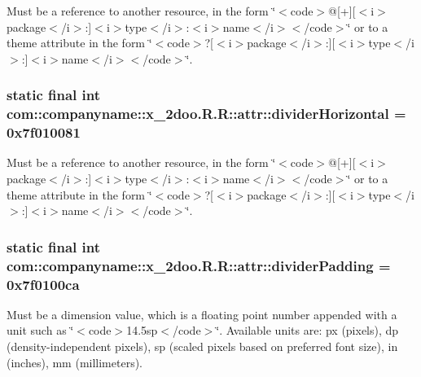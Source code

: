 Must be a reference to another resource, in the form \char`\"{}$<$code$>$@\mbox{[}+\mbox{]}\mbox{[}$<$i$>$package$<$/i$>$:\mbox{]}$<$i$>$type$<$/i$>$:$<$i$>$name$<$/i$>$$<$/code$>$\char`\"{} or to a theme attribute in the form \char`\"{}$<$code$>$?\mbox{[}$<$i$>$package$<$/i$>$:\mbox{]}\mbox{[}$<$i$>$type$<$/i$>$:\mbox{]}$<$i$>$name$<$/i$>$$<$/code$>$\char`\"{}. \hypertarget{classcom_1_1companyname_1_1x__2doo_1_1_r_1_1attr_4340022d2d1a7ccbb552d9834d51712e}{
\subsubsection[{dividerHorizontal}]{\setlength{\rightskip}{0pt plus 5cm}static final int com::companyname::x\_\-2doo.R.R::attr::dividerHorizontal = 0x7f010081}}
\label{classcom_1_1companyname_1_1x__2doo_1_1_r_1_1attr_4340022d2d1a7ccbb552d9834d51712e}


Must be a reference to another resource, in the form \char`\"{}$<$code$>$@\mbox{[}+\mbox{]}\mbox{[}$<$i$>$package$<$/i$>$:\mbox{]}$<$i$>$type$<$/i$>$:$<$i$>$name$<$/i$>$$<$/code$>$\char`\"{} or to a theme attribute in the form \char`\"{}$<$code$>$?\mbox{[}$<$i$>$package$<$/i$>$:\mbox{]}\mbox{[}$<$i$>$type$<$/i$>$:\mbox{]}$<$i$>$name$<$/i$>$$<$/code$>$\char`\"{}. \hypertarget{classcom_1_1companyname_1_1x__2doo_1_1_r_1_1attr_e4acde97febf88123516d78fab6674d4}{
\subsubsection[{dividerPadding}]{\setlength{\rightskip}{0pt plus 5cm}static final int com::companyname::x\_\-2doo.R.R::attr::dividerPadding = 0x7f0100ca}}
\label{classcom_1_1companyname_1_1x__2doo_1_1_r_1_1attr_e4acde97febf88123516d78fab6674d4}


Must be a dimension value, which is a floating point number appended with a unit such as \char`\"{}$<$code$>$14.5sp$<$/code$>$\char`\"{}. Available units are: px (pixels), dp (density-independent pixels), sp (scaled pixels based on preferred font size), in (inches), mm (millimeters). 

